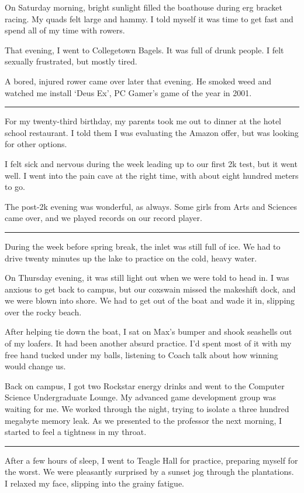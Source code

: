 On Saturday morning, bright sunlight filled the boathouse during erg bracket
racing.  My quads felt large and hammy.  I told myself it was time to get fast
and spend all of my time with rowers.

That evening, I went to Collegetown Bagels.  It was full of drunk people.  I
felt sexually frustrated, but mostly tired.

A bored, injured rower came over later that evening.  He smoked weed and watched
me install `Deus Ex', PC Gamer's game of the year in 2001.

\plainfancybreak{12pt}{2}{}

For my twenty-third birthday, my parents took me out to dinner at the hotel
school restaurant.  I told them I was evaluating the Amazon offer, but was
looking for other options.

I felt sick and nervous during the week leading up to our first 2k test, but it
went well.  I went into the pain cave at the right time, with about eight
hundred meters to go.

The post-2k evening was wonderful, as always.  Some girls from Arts and Sciences
came over, and we played records on our record player.

\plainfancybreak{12pt}{2}{}

During the week before spring break, the inlet was still full of ice.  We had to
drive twenty minutes up the lake to practice on the cold, heavy water.

On Thursday evening, it was still light out when we were told to head in.  I was
anxious to get back to campus, but our coxswain missed the makeshift dock, and
we were blown into shore.  We had to get out of the boat and wade it in,
slipping over the rocky beach.

After helping tie down the boat, I sat on Max's bumper and shook seashells out
of my loafers.  It had been another absurd practice.  I'd spent most of it with
my free hand tucked under my balls, listening to Coach talk about how winning
would change us.

Back on campus, I got two Rockstar energy drinks and went to the Computer
Science Undergraduate Lounge.  My advanced game development group was waiting
for me.  We worked through the night, trying to isolate a three hundred megabyte
memory leak.  As we presented to the professor the next morning, I started to
feel a tightness in my throat.

\plainfancybreak{12pt}{2}{}

After a few hours of sleep, I went to Teagle Hall for practice, preparing myself
for the worst.  We were pleasantly surprised by a sunset jog through the
plantations.  I relaxed my face, slipping into the grainy fatigue.

